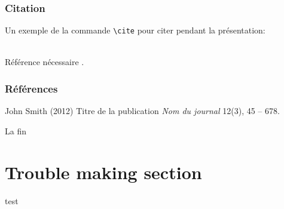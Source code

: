 \documentclass{beamer}
\begin{document}

\begin{frame}[fragile] 
\frametitle{Citation}
Un exemple de la commande \verb|\cite| pour citer pendant la présentation:\\~

Référence nécessaire \cite{p1}.
\end{frame}


\begin{frame}
\frametitle{Références}
\footnotesize{
\begin{thebibliography}{99} 
 John Smith (2012)
\newblock Titre de la publication
\newblock \emph{Nom du journal} 12(3), 45 -- 678.
\end{thebibliography}
}
\end{frame}


\begin{frame}
\Huge{\centerline{La fin}}
\end{frame}


\section{Trouble making section}

\begin{frame}
    test
\end{frame}
\end{document}
